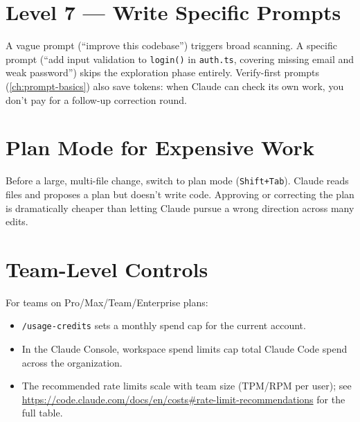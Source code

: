\section{Level 7 — Write Specific Prompts}
\label{sec:cost-prompts}


A vague prompt (``improve this codebase'') triggers broad scanning. A
specific prompt (``add input validation to \texttt{login()} in
\texttt{auth.ts}, covering missing email and weak password'') skips the
exploration phase entirely. Verify-first prompts
(\cref{ch:prompt-basics}) also save tokens: when Claude can check its own
work, you don't pay for a follow-up correction round.

\section{Plan Mode for Expensive Work}
\label{sec:cost-plan-mode}


Before a large, multi-file change, switch to plan mode (\texttt{Shift+Tab}).
Claude reads files and proposes a plan but doesn't write code. Approving
or correcting the plan is dramatically cheaper than letting Claude pursue
a wrong direction across many edits.

\section{Team-Level Controls}
\label{sec:cost-team}


For teams on Pro/Max/Team/Enterprise plans:

\begin{itemize}
  \item \texttt{/usage-credits} sets a monthly spend cap for the current
        account.
  \item In the Claude Console, workspace spend limits cap total Claude
        Code spend across the organization.
  \item The recommended rate limits scale with team size (TPM/RPM per
        user); see
        \url{https://code.claude.com/docs/en/costs\#rate-limit-recommendations}
        for the full table.
\end{itemize}

